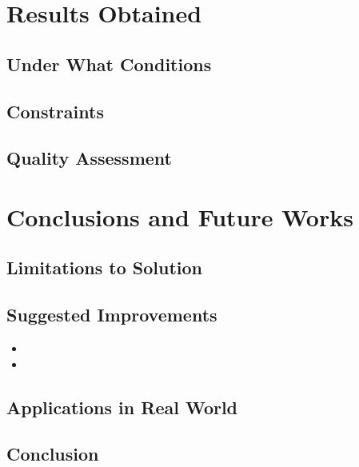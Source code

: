\documentclass{article}
\begin{document}
\section{Results Obtained}
\subsection{Under What Conditions}
\lipsum[21]

\subsection{Constraints}
\lipsum[22]

\subsection{Quality Assessment}
\lipsum[23]

\section{Conclusions and Future Works}
\subsection{Limitations to Solution}
\lipsum[24]

\subsection{Suggested Improvements}
\begin{itemize}
  \item \lipsum[25]
  \item \lipsum[26]
\end{itemize}

\subsection{Applications in Real World}
\lipsum[27]

\subsection{Conclusion}
\lipsum[28]
\end{document}
